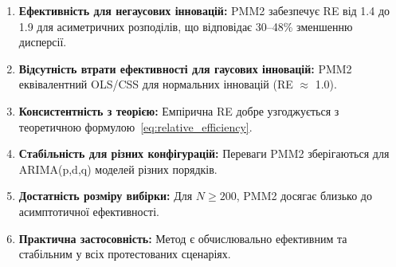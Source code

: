 \documentclass[12pt,a4paper]{article}
\begin{document}
\begin{enumerate}
    \item \textbf{Ефективність для негаусових інновацій:} PMM2 забезпечує RE від 1.4 до 1.9 для асиметричних розподілів, що відповідає 30--48\% зменшенню дисперсії.

    \item \textbf{Відсутність втрати ефективності для гаусових інновацій:} PMM2 еквівалентний OLS/CSS для нормальних інновацій (RE $\approx$ 1.0).

    \item \textbf{Консистентність з теорією:} Емпірична RE добре узгоджується з теоретичною формулою~\eqref{eq:relative_efficiency}.

    \item \textbf{Стабільність для різних конфігурацій:} Переваги PMM2 зберігаються для ARIMA(p,d,q) моделей різних порядків.

    \item \textbf{Достатність розміру вибірки:} Для $N \geq 200$, PMM2 досягає близько до асимптотичної ефективності.

    \item \textbf{Практична застосовність:} Метод є обчислювально ефективним та стабільним у всіх протестованих сценаріях.
\end{enumerate}




\end{document}
